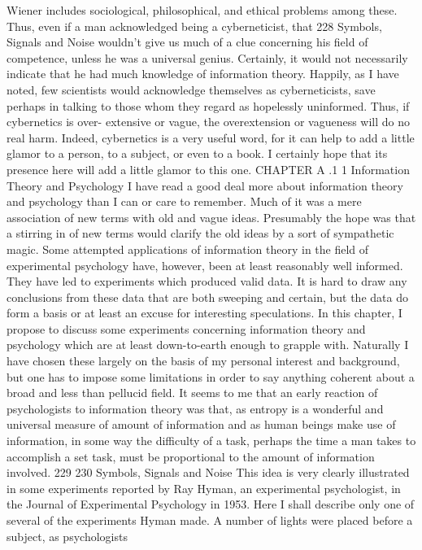 {{{{{{{{{{{Wiener includes sociological, philosophical, and ethical problems
among these.
Thus, even if a man acknowledged being a cyberneticist, that
228 Symbols, Signals and Noise
wouldn’t give us much of a clue concerning his field of competence,
unless he was a universal genius. Certainly, it would not necessarily
indicate that he had much knowledge of information theory.
Happily, as I have noted, few scientists would acknowledge
themselves as cyberneticists, save perhaps in talking to those whom
they regard as hopelessly uninformed. Thus, if cybernetics is over-
extensive or vague, the overextension or vagueness will do no real
harm. Indeed, cybernetics is a very useful word, for it can help to
add a little glamor to a person, to a subject, or even to a book. I
certainly hope that its presence here will add a little glamor to
this one.
CHAPTER A .1 1 Information Theory
and Psychology
I have read a good deal more about information theory and
psychology than I can or care to remember. Much of it was a mere
association of new terms with old and vague ideas. Presumably
the hope was that a stirring in of new terms would clarify the old
ideas by a sort of sympathetic magic.
Some attempted applications of information theory in the field
of experimental psychology have, however, been at least reasonably
well informed. They have led to experiments which produced
valid data. It is hard to draw any conclusions from these data that
are both sweeping and certain, but the data do form a basis or at
least an excuse for interesting speculations. In this chapter, I
propose to discuss some experiments concerning information
theory and psychology which are at least down-to-earth enough
to grapple with. Naturally I have chosen these largely on the basis
of my personal interest and background, but one has to impose
some limitations in order to say anything coherent about a broad
and less than pellucid field.
It seems to me that an early reaction of psychologists to information
theory was that, as entropy is a wonderful and universal
measure of amount of information and as human beings make use
of information, in some way the difficulty of a task, perhaps the
time a man takes to accomplish a set task, must be proportional
to the amount of information involved.
229
230
Symbols, Signals and Noise
This idea is very clearly illustrated in some experiments reported
by Ray Hyman, an experimental psychologist, in the Journal of
Experimental Psychology in 1953. Here I shall describe only one
of several of the experiments Hyman made.
A number of lights were placed before a subject, as psychologists
}}}}}}}}}}}
